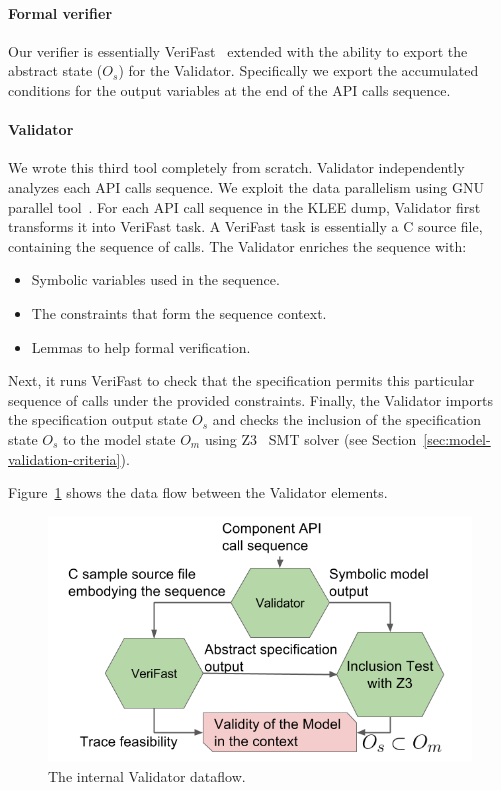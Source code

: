 \documentclass[letterpaper,twocolumn,10pt]{article}
\begin{document}
\paragraph{Formal verifier} Our verifier is essentially
VeriFast~\cite{jacobs2008verifast} extended with the ability to export the
abstract state (\(O_s\)) for the Validator. Specifically we export the
accumulated conditions for the output variables at the end of the API calls
sequence.

\paragraph{Validator} We wrote this third tool completely from scratch.
Validator independently analyzes each API calls sequence. We exploit the data
parallelism using GNU parallel tool~\cite{Tange2011a}. For each API call
sequence in the KLEE dump, Validator first transforms it into VeriFast task. A
VeriFast task is essentially a C source file, containing the sequence of calls.
The Validator enriches the sequence with:
\begin{itemize}
    \item Symbolic variables used in the sequence.
    \item The constraints that form the sequence context.
    \item Lemmas to help formal verification.
\end{itemize}
Next, it runs VeriFast to check that the specification permits this particular
sequence of calls under the provided constraints. Finally, the Validator imports
the specification output state \(O_s\) and checks the inclusion of the
specification state \(O_s\) to the model state \(O_m\) using Z3~\cite{de2008z3}
SMT solver (see Section~\ref{sec:model-validation-criteria}).

Figure~\ref{fig:validator} shows the data flow between the Validator elements.

\begin{figure}[h]
    \includegraphics[width=\columnwidth]{figures/validator.png}
    \caption{The internal Validator dataflow.}
    \label{fig:validator}
\end{figure}
\end{document}
